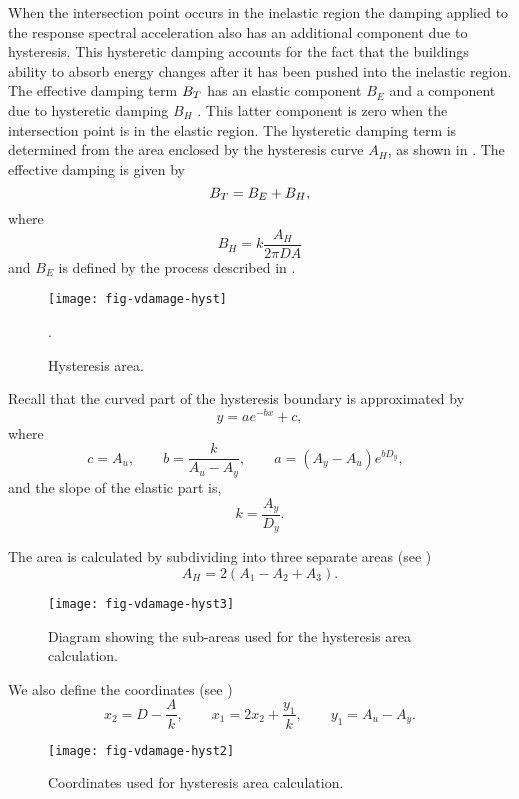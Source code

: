When the intersection point occurs in the inelastic region the
damping applied to the response spectral
acceleration also has an
additional component due to hysteresis. This hysteretic damping
accounts for the fact that the buildings ability to absorb energy
changes after it has been pushed into the inelastic region. The
effective damping term $\Beff$ has an
elastic component $B_E$ and a component due to hysteretic damping
$B_H$ . This latter component is zero when the intersection point
is in the elastic region. The hysteretic damping term is
determined from the area enclosed by the hysteresis curve $A_H$,
as shown in . The effective
damping is given by
\begin{equation}
\Beff = B_E + B_H,
\end{equation}
where
\begin{equation}
B_H = k \frac{A_H}{2\pi DA}
\end{equation}
and $B_E$ is defined by the process described in
.
\begin{figure}
\centering
{}
\texttt{[image: fig-vdamage-hyst]}
\caption{Hysteresis area.}
\label{fig:vdamage-hystarea}.
\end{figure}

Recall that the curved part of the hysteresis boundary is
approximated by
$$
 y = ae^{-bx}+c,
$$
where
$$
 c = A_u, \qquad
 b = \frac{k}{A_u-A_y}, \qquad
 a = (A_y-A_u)e^{b D_y}, \qquad
$$
and the slope of the elastic part is,
$$
 k = \frac{A_y}{D_y}.
$$

The area is calculated by subdividing into three separate areas
(see )
$$
 A_H = 2(A_1-A_2+A_3).
$$

\begin{figure}[htp]
\centering
{}
\texttt{[image: fig-vdamage-hyst3]}
\caption{Diagram showing the sub-areas used for the hysteresis
area calculation.}
\label{fig:vdamage-hyst3}
\end{figure}


We also define the coordinates (see )
$$
x_2 = D-\frac{A}{k}, \qquad x_1 = 2x_2+\frac{y_1}{k}, \qquad y_1 =
A_u-A_y.
$$

\begin{figure}[htp]
\centering {}  
  
\texttt{[image: fig-vdamage-hyst2]}
\caption{Coordinates used for hysteresis area calculation.}
\label{fig:vdamage-hyst2}
\end{figure}

